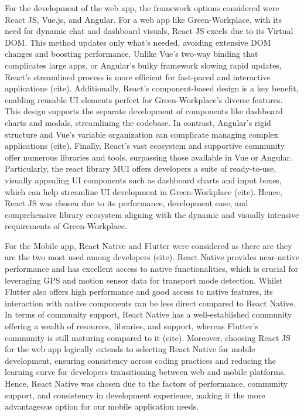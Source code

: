 \documentclass{l4proj}
\begin{document}
For the development of the web app, the framework options considered were React JS, Vue.js, and Angular. For a web app like Green-Workplace, with its need for dynamic chat and dashboard visuals, React JS excels due to its Virtual DOM. This method updates only what's needed, avoiding extensive DOM changes and boosting performance. Unlike Vue's two-way binding that complicates large apps, or Angular's bulky framework slowing rapid updates, React's streamlined process is more efficient for fast-paced and interactive applications (cite). Additionally, React's component-based design is a key benefit, enabling reusable UI elements perfect for Green-Workplace's diverse features. This design supports the separate development of components like dashboard charts and modals, streamlining the codebase. In contrast, Angular's rigid structure and Vue's variable organization can complicate managing complex applications (cite). Finally, React's vast ecosystem and supportive community offer numerous libraries and tools, surpassing those available in Vue or Angular. Particularly, the react library MUI offers developers a suite of ready-to-use, visually appealing UI components such as dashboard charts and input boxes, which can help streamline UI development in Green-Workplace (cite). Hence, React JS was chosen due to its performance, development ease, and comprehensive library ecosystem aligning with the dynamic and visually intensive requirements of Green-Workplace.

For the Mobile app, React Native and Flutter were considered as there are they are the two most used among developers (cite). React Native provides near-native performance and has excellent access to native functionalities, which is crucial for leveraging GPS and motion sensor data for transport mode detection. Whilst Flutter also offers high performance and good access to native features, its interaction with native components can be less direct compared to React Native. In terms of community support, React Native has a well-established community offering a wealth of resources, libraries, and support, whereas Flutter's community is still maturing compared to it (cite). Moreover, choosing React JS for the web app logically extends to selecting React Native for mobile development, ensuring consistency across coding practices and reducing the learning curve for developers transitioning between web and mobile platforms. Hence, React Native was chosen due to the factors of performance, community support, and consistency in development experience, making it the more advantageous option for our mobile application needs.
\end{document}

